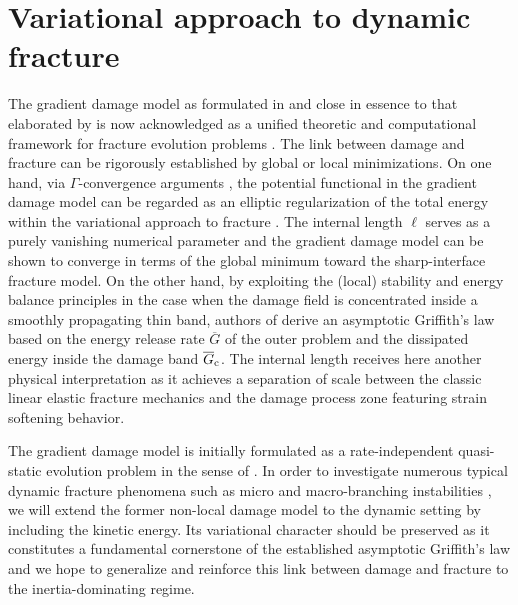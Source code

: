 \chapter{Variational approach to dynamic fracture}
\minitoc

The gradient damage model as formulated in \cite{PhamMarigo:2010-1} and close in essence to that elaborated by \cite{LorentzAndrieux:1999} is now acknowledged as a unified theoretic and computational framework for fracture evolution problems \cite{FreddiRoyer-Carfagni:2010,PhamAmorMarigoMaurini:2011,LorentzGodard:2011}. The link between damage and fracture can be rigorously established by global or local minimizations. On one hand, via $\Gamma$-convergence arguments \cite{Braides:2002}, the potential functional in the gradient damage model can be regarded as an elliptic regularization of the total energy within the variational approach to fracture \cite{BourdinFrancfortMarigo:2008}. The internal length $\ell$ serves as a purely vanishing numerical parameter and the gradient damage model can be shown to converge in terms of the global minimum toward the sharp-interface fracture model. On the other hand, by exploiting the (local) stability and energy balance principles in the case when the damage field is concentrated inside a smoothly propagating thin band, authors of \cite{SicsicMarigo:2013} derive an asymptotic Griffith's law based on the energy release rate $\overline{G}$ of the outer problem and the dissipated energy inside the damage band $\overline{G}_{\mathrm{c}}$. The internal length receives here another physical interpretation as it achieves a separation of scale between the classic linear elastic fracture mechanics \cite{Griffith:1921} and the damage process zone featuring strain softening behavior.

The gradient damage model is initially formulated as a rate-independent quasi-static evolution problem in the sense of \cite{Mielke:2005}. In order to investigate numerous typical dynamic fracture phenomena such as micro and macro-branching instabilities \cite{BouchbinderGoldmanFineberg:2014}, we will extend the former non-local damage model to the dynamic setting by including the kinetic energy. Its variational character should be preserved as it constitutes a fundamental cornerstone of the established asymptotic Griffith's law \cite{SicsicMarigo:2013} and we hope to generalize and reinforce this link between damage and fracture to the inertia-dominating regime.

